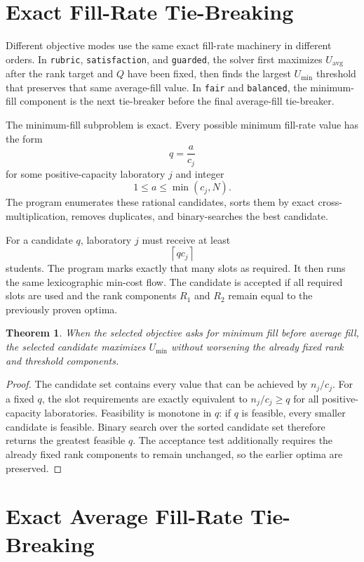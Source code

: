 \documentclass[11pt,a4paper]{article}
\newtheorem{theorem}{Theorem}
\begin{document}
\section{Exact Fill-Rate Tie-Breaking}

Different objective modes use the same exact fill-rate machinery in different
orders.  In \texttt{rubric}, \texttt{satisfaction}, and \texttt{guarded}, the
solver first maximizes \(U_{\mathrm{avg}}\) after the rank target and \(Q\)
have been fixed, then finds the largest \(U_{\min}\) threshold that preserves
that same average-fill value.  In \texttt{fair} and \texttt{balanced}, the
minimum-fill component is the next tie-breaker before the final average-fill
tie-breaker.

The minimum-fill subproblem is exact.  Every possible minimum fill-rate value
has the form
\[
  q=\frac{a}{c_j}
\]
for some positive-capacity laboratory \(j\) and integer
\[
  1 \leq a \leq \min(c_j,N).
\]
The program enumerates these rational candidates, sorts them by exact
cross-multiplication, removes duplicates, and binary-searches the best
candidate.

For a candidate \(q\), laboratory \(j\) must receive at least
\[
  \left\lceil q c_j \right\rceil
\]
students.  The program marks exactly that many slots as required.  It then
runs the same lexicographic min-cost flow.  The candidate is accepted if all
required slots are used and the rank components \(R_1\) and \(R_2\) remain
equal to the previously proven optima.

\begin{theorem}
When the selected objective asks for minimum fill before average fill, the
selected candidate maximizes \(U_{\min}\) without worsening the already fixed
rank and threshold components.
\end{theorem}

\begin{proof}
The candidate set contains every value that can be achieved by
\(n_j/c_j\).  For a fixed \(q\), the slot requirements are exactly equivalent
to \(n_j/c_j\geq q\) for all positive-capacity laboratories.  Feasibility is
monotone in \(q\): if \(q\) is feasible, every smaller candidate is feasible.
Binary search over the sorted candidate set therefore returns the greatest
feasible \(q\).  The acceptance test additionally requires the already fixed
rank components to remain unchanged, so the earlier optima are preserved.
\end{proof}

\section{Exact Average Fill-Rate Tie-Breaking}
\label{sec:exact-average-fill}
\end{document}
